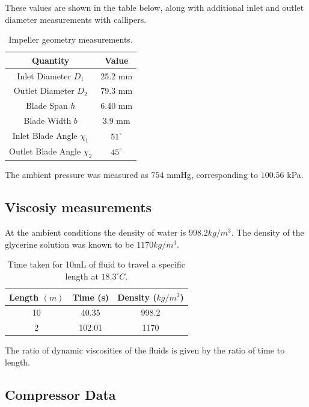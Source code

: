 \documentclass{article}
\begin{document}
These values are shown in the table below, along with additional inlet and outlet diameter measurements with callipers.

\begin{table}[H]
    \centering
    \begin{tabular}{|c|c|}
        \hline
        \textbf{Quantity} & \textbf{Value} \\
        \hline
        Inlet Diameter $D_1$ & 25.2 mm \\
        Outlet Diameter $D_2$ & 79.3 mm \\
        Blade Span $h$ & 6.40 mm \\
        Blade Width $b$ & 3.9 mm \\
        Inlet Blade Angle $\chi_1$ & $51^\circ$ \\
        Outlet Blade Angle $\chi_2$ & $45^\circ$ \\
        \hline
    \end{tabular}
    \caption{Impeller geometry measurements.}
    \label{tab:impeller_geometry}
\end{table}

The ambient pressure was measured as $754$ mmHg, corresponding to $100.56$ kPa.

\subsection{Viscosiy measurements}

At the ambient conditions the density of water is $998.2 kg/m^3$.
The density of the glycerine solution was known to be $1170 kg/m^3$.

\begin{table}[H]
    \centering
    \begin{tabular}{|c|c|c|}
        \hline
        \textbf{Length} $(m)$ & \textbf{Time} (s) & \textbf{Density} ($kg/m^3$) \\
        \hline
        10 & 40.35 & 998.2 \\
        2 & 102.01 & 1170 \\
        \hline
    \end{tabular}
    \caption{Time taken for 10mL of fluid to travel a specific length at $18.3^\circ C.$}
    \label{tab:viscosity}
\end{table}

The ratio of dynamic viscosities of the fluids is given by the ratio of time to length.

\subsection{Compressor Data}
\end{document}

